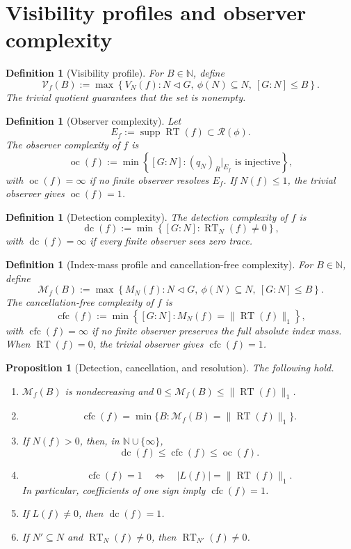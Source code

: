 \documentclass[11pt]{article}
\newtheorem{proposition}[theorem]{Proposition}
\newtheorem{definition}[theorem]{Definition}
\DeclareMathOperator{\supp}{supp}
\DeclareMathOperator{\oc}{oc}
\DeclareMathOperator{\dc}{dc}
\DeclareMathOperator{\cfc}{cfc}
\newcommand{\RT}{\operatorname{RT}}
\newcommand{\RN}{\mathcal R}
\newcommand{\VN}{\mathcal V}
\newcommand{\MN}{\mathcal M}
\newcommand{\N}{\mathbb N}
\begin{document}
\section{Visibility profiles and observer complexity}
\label{sec:profile}

\begin{definition}[Visibility profile]
For $B\in\N$, define
\[
  \VN_f(B)
  :=\max\left\{V_N(f): N\triangleleft G,\ \phi(N)\subseteq N,
  \ [G:N]\le B\right\}.
\]
The trivial quotient guarantees that the set is nonempty.
\end{definition}

\begin{definition}[Observer complexity]
Let
\[
  E_f:=\supp\RT(f)\subset\RN(\phi).
\]
The observer complexity of $f$ is
\[
  \oc(f):=
  \min\left\{[G:N]:(q_N)_R|_{E_f}\text{ is injective}\right\},
\]
with $\oc(f)=\infty$ if no finite observer resolves $E_f$.  If
$N(f)\le1$, the trivial observer gives $\oc(f)=1$.
\end{definition}

\begin{definition}[Detection complexity]
The detection complexity of $f$ is
\[
  \dc(f):=
  \min\left\{[G:N]:\RT_N(f)\ne0\right\},
\]
with $\dc(f)=\infty$ if every finite observer sees zero trace.
\end{definition}


\begin{definition}[Index-mass profile and cancellation-free complexity]
For $B\in\N$, define
\[
  \MN_f(B)
  :=\max\left\{M_N(f):N\triangleleft G,\ \phi(N)\subseteq N,
  \ [G:N]\le B\right\}.
\]
The cancellation-free complexity of $f$ is
\[
  \cfc(f)
  :=\min\left\{[G:N]:M_N(f)=\|\RT(f)\|_1\right\},
\]
with $\cfc(f)=\infty$ if no finite observer preserves the full absolute
index mass.  When $\RT(f)=0$, the trivial observer gives $\cfc(f)=1$.
\end{definition}

\begin{proposition}[Detection, cancellation, and resolution]
\label{prop:threelevels}
The following hold.
\begin{enumerate}[label=(\roman*)]
\item $\MN_f(B)$ is nondecreasing and
      $0\le \MN_f(B)\le\|\RT(f)\|_1$.
\item
      \[
        \cfc(f)=\min\{B:\MN_f(B)=\|\RT(f)\|_1\}.
      \]
\item If $N(f)>0$, then, in $\N\cup\{\infty\}$,
      \[
        \dc(f)\le\cfc(f)\le\oc(f).
      \]
\item
      \[
        \cfc(f)=1
        \quad\Longleftrightarrow\quad
        |L(f)|=\|\RT(f)\|_1.
      \]
      In particular, coefficients of one sign imply $\cfc(f)=1$.
\item If $L(f)\ne0$, then $\dc(f)=1$.
\item If $N'\subseteq N$ and $\RT_N(f)\ne0$, then
      $\RT_{N'}(f)\ne0$.
\end{enumerate}
\end{proposition}
\end{document}
